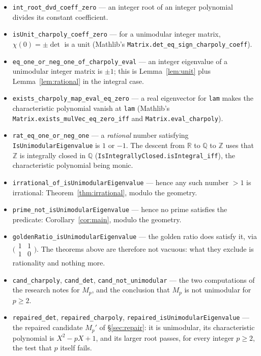 \documentclass[11pt]{article}
\theoremstyle{plain}
\theoremstyle{definition}
\theoremstyle{remark}
\newcommand{\ZZ}{\mathbb{Z}}
\newcommand{\QQ}{\mathbb{Q}}
\newcommand{\RR}{\mathbb{R}}
\begin{document}
\begin{itemize}
  \item \texttt{int\_root\_dvd\_coeff\_zero} --- an integer root of an integer
    polynomial divides its constant coefficient.
  \item \texttt{isUnit\_charpoly\_coeff\_zero} --- for a unimodular integer
    matrix, $\chi(0)=\pm\det$ is a unit (Mathlib's
    \texttt{Matrix.det\_eq\_sign\_charpoly\_coeff}).
  \item \texttt{eq\_one\_or\_neg\_one\_of\_charpoly\_eval} --- an integer
    eigenvalue of a unimodular integer matrix is $\pm1$; this is
    Lemma~\ref{lem:unit} plus Lemma~\ref{lem:rational} in the integral case.
  \item \texttt{exists\_charpoly\_map\_eval\_eq\_zero} --- a real eigenvector for
    \texttt{lam} makes the characteristic polynomial vanish at \texttt{lam}
    (Mathlib's \texttt{Matrix.exists\_mulVec\_eq\_zero\_iff} and
    \texttt{Matrix.eval\_charpoly}).
  \item \texttt{rat\_eq\_one\_or\_neg\_one} --- a \emph{rational} number
    satisfying \texttt{IsUnimodularEigenvalue} is $1$ or $-1$. The descent from
    $\RR$ to $\QQ$ to $\ZZ$ uses that $\ZZ$ is integrally closed in $\QQ$
    (\texttt{IsIntegrallyClosed.isIntegral\_iff}), the characteristic polynomial
    being monic.
  \item \texttt{irrational\_of\_isUnimodularEigenvalue} --- hence any such number
    $>1$ is irrational: Theorem~\ref{thm:irrational}, modulo the geometry.
  \item \texttt{prime\_not\_isUnimodularEigenvalue} --- hence no prime satisfies
    the predicate: Corollary~\ref{cor:main}, modulo the geometry.
  \item \texttt{goldenRatio\_isUnimodularEigenvalue} --- the golden ratio does
    satisfy it, via $\bigl(\begin{smallmatrix}1&1\\1&0\end{smallmatrix}\bigr)$. The
    theorems above are therefore not vacuous: what they exclude is rationality and
    nothing more.
  \item \texttt{cand\_charpoly}, \texttt{cand\_det},
    \texttt{cand\_not\_unimodular} --- the two computations of the research notes
    for $M_{p}$, and the conclusion that $M_{p}$ is not unimodular for $p\ge2$.
  \item \texttt{repaired\_det}, \texttt{repaired\_charpoly},
    \texttt{repaired\_isUnimodularEigenvalue} --- the repaired candidate $M_{p}'$
    of \S\ref{sec:repair}: it is unimodular, its characteristic polynomial is
    $X^{2}-pX+1$, and its larger root passes, for every integer $p\ge2$, the test
    that $p$ itself fails.
\end{itemize}
\end{document}
